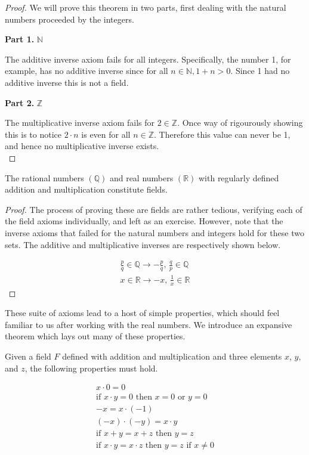 \documentclass[twoside]{report}
\newcommand{\header}[2]{\begin{flushright} \textbf{#1} #2 \end{flushright}}
\begin{document}
\begin{proof} 
	We will prove this theorem in two parts, first dealing with the natural numbers proceeded by the integers.
	\header{Part 1. }{$\mathbb{N}$}
	The additive inverse axiom fails for all integers. Specifically, the number 1, for example, has no additive inverse since for all $n \in \mathbb{N}, 1 + n > 0$. Since 1 had no additive inverse this is not a field.
	
	\header{Part 2. }{$\mathbb{Z}$}
	The multiplicative inverse axiom fails for $2 \in \mathbb{Z}$. Once way of rigourously showing this is to notice $2 \cdot n$ is even for all $n \in \mathbb{Z}$. Therefore this value can never be 1, and hence no multiplicative inverse exists. \\
\end{proof}
\vspace{\baselineskip}

\vspace{\baselineskip}
\begin{theorem}
	The rational numbers $(\mathbb{Q})$ and real numbers $(\mathbb{R})$ with regularly defined addition and multiplication constitute fields.
\end{theorem}

\begin{proof}
	The process of proving these are fields are rather tedious, verifying each of the field axioms individually, and left as an exercise. However, note that the inverse axioms that failed for the natural numbers and integers hold for these two sets. The additive and multiplicative inverses are respectively shown below.
	
	\begin{align*}
		\frac{p}{q} \in \mathbb{Q} \rightarrow -\frac{p}{q}, \, \frac{q}{p} \in \mathbb{Q} \\
		x \in \mathbb{R} \rightarrow -x, \, \frac{1}{x} \in \mathbb{R}
	\end{align*}
\end{proof}
\vspace{\baselineskip}

These suite of axioms lead to a host of simple properties, which should feel familiar to us after working with the real numbers. We introduce an expansive theorem which lays out many of these properties.

\vspace{\baselineskip}
\begin{theorem}
	Given a field $F$ defined with addition and multiplication and three elements $x$, $y$, and $z$, the following properties must hold.
	
	\begin{align}
		x \cdot 0 = 0 \\
		\text{if } x \cdot y = 0 \text{ then } x = 0 \text { or } y = 0 \\
		-x = x \cdot (-1) \\
		(-x) \cdot (-y) = x \cdot y \\
		\text{if } x + y = x + z \text{ then } y = z \\
		\text{if } x \cdot y = x \cdot z \text{ then } y = z \text { if } x \neq 0
	\end{align}
\end{theorem}
\end{document}
